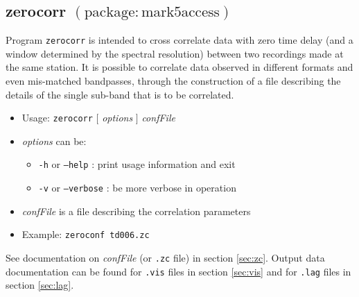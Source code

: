 
\subsection{zerocorr {\small $\mathrm{(package: mark5access)}$}} \label{sec:zerocorr}

Program {\tt zerocorr} is intended to cross correlate data with zero time delay (and a window determined by the spectral resolution) between two recordings made at the same station.
It is possible to correlate data observed in different formats and even mis-matched bandpasses, through the construction of a file describing the details of the single sub-band that is to be correlated.

\begin{itemize}
\item[] Usage: {\tt zerocorr} $[$ {\em options} $]$ {\em confFile} 
\item[] {\em options} can be:
\begin{itemize}
\item[] {\tt -h} or {\tt --help} : print usage information and exit
\item[] {\tt -v} or {\tt --verbose} : be more verbose in operation
\end{itemize}
\item[] {\em confFile} is a file describing the correlation parameters
\item[] Example: {\tt zeroconf td006.zc}
\end{itemize}

See documentation on {\em confFile} (or {\tt .zc} file) in section \ref{sec:zc}.
Output data documentation can be found for {\tt .vis} files in section \ref{sec:vis} and for {\tt .lag} files in section \ref{sec:lag}.
